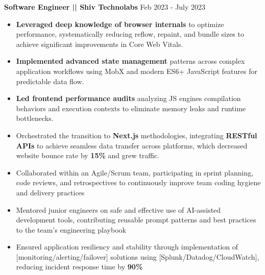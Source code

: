 \vspace{5pt}
\textbf{Software Engineer || Shiv Technolabs}
\hfill Feb 2023 - July 2023
\begin{itemize}
\vspace{2pt}
\item {\textbf{Leveraged deep knowledge of browser internals} to optimize performance, systematically reducing reflow, repaint, and bundle sizes to achieve significant improvements in Core Web Vitals.}
\item {\textbf{Implemented advanced state management} patterns across complex application workflows using MobX and modern ES6+ JavaScript features for predictable data flow.}
\item {\textbf{Led frontend performance audits} analyzing JS engines compilation behaviors and execution contexts to eliminate memory leaks and runtime bottlenecks.}
\item {Orchestrated the transition to \textbf{Next.js} methodologies, integrating \textbf{RESTful APIs} to achieve seamless data transfer across platforms, which decreased website bounce rate by \textbf{15\%} and grew traffic.}
\item Collaborated within an Agile/Scrum team, participating in sprint planning, code reviews, and retrospectives to continuously improve team coding hygiene and delivery practices
\item Mentored junior engineers on safe and effective use of AI-assisted development tools, contributing reusable prompt patterns and best practices to the team's engineering playbook
\item Ensured application resiliency and stability through implementation of [monitoring/alerting/failover] solutions using [Splunk/Datadog/CloudWatch], reducing incident response time by \textbf{90\%}
\end{itemize}




